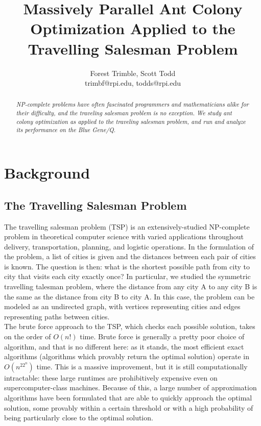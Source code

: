 \documentclass[twocolumn]{article}
\title{Massively Parallel Ant Colony Optimization Applied to the Travelling Salesman Problem}
\author{Forest Trimble, Scott Todd\\trimbf@rpi.edu, todds@rpi.edu}
\begin{document}
\maketitle

\pagestyle{fancy}
\fancyhead{}
\fancyhead[R]{\today}

\begin{abstract}
  \emph{NP-complete problems have often fascinated programmers and mathematicians alike
  for their difficulty, and the traveling salesman problem is no exception. We 
  study ant colony optimization as applied to the traveling salesman problem, 
  and run and analyze its performance on the Blue Gene/Q. }
\end{abstract}

\section{Background}

\subsection{The Travelling Salesman Problem}

The travelling salesman problem (TSP) is an extensively-studied NP-complete problem 
in theoretical computer science with varied applications throughout delivery, 
transportation, planning, and logistic operations. In the formulation of the 
problem, a list of cities is given and the distances between each pair of cities
is known. The question is then: what is the shortest possible path from city to
city that visits each city exactly once? In particular, we studied the symmetric
travelling talesman problem, where the distance from any city A to any city B
is the same as the distance from city B to city A. In this case, the problem
can be modeled as an undirected graph, with vertices representing cities and
edges representing paths between cities.\\

The brute force approach to the TSP, which checks each possible solution, takes 
on the order of $O(n!)$ time. Brute force is generally a pretty poor choice of
algorithm, and that is no different here: as it stands, the most efficient exact 
algorithms (algorithms which provably return the optimal solution) operate in
$O(n^22^n)$ time. This is a massive improvement, but it is still computationally
intractable: these large runtimes are prohibitively expensive even on 
supercomputer-class machines. Because of this, a large number of approximation 
algorithms have been formulated that are able to quickly approach the optimal 
solution, some provably within a certain threshold or with a high probability of
being particularly close to the optimal solution. 
\end{document}
